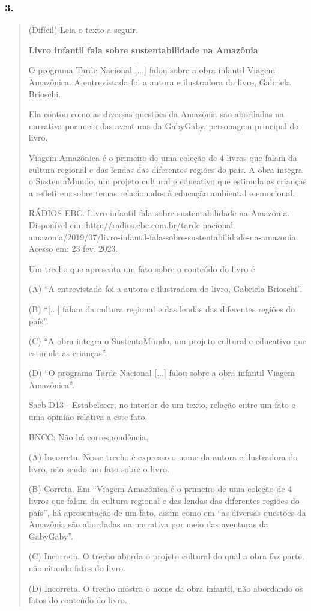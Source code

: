 \subsubsection{3.}\label{section-65}

\begin{quote}
(Difícil) Leia o texto a seguir.

\textbf{Livro infantil fala sobre sustentabilidade na Amazônia}

O programa Tarde Nacional {[}...{]} falou sobre a obra infantil Viagem
Amazônica. A entrevistada foi a autora e ilustradora do livro, Gabriela
Brioschi.

Ela contou como as diversas questões da Amazônia são abordadas na
narrativa por meio das aventuras da GabyGaby, personagem principal do
livro.~

Viagem Amazônica é o primeiro de uma coleção de 4 livros que falam da
cultura regional e das lendas das diferentes regiões do país. A obra
integra o SustentaMundo, um projeto cultural e educativo que estimula as
crianças a refletirem sobre temas relacionados à educação ambiental e
emocional.

RÁDIOS EBC. Livro infantil fala sobre sustentabilidade na Amazônia.
Disponível em:
http://radios.ebc.com.br/tarde-nacional-amazonia/2019/07/livro-infantil-fala-sobre-sustentabilidade-na-amazonia.
Acesso em: 23 fev. 2023.

Um trecho que apresenta um fato sobre o conteúdo do livro é

(A) ``A entrevistada foi a autora e ilustradora do livro, Gabriela
Brioschi''.

(B) ``{[}...{]} falam da cultura regional e das lendas das diferentes
regiões do país''.

(C) ``A obra integra o SustentaMundo, um projeto cultural e educativo
que estimula as crianças''.

(D) ``O programa Tarde Nacional {[}...{]} falou sobre a obra infantil
Viagem Amazônica''.

Saeb D13 - Estabelecer, no interior de um texto, relação entre um fato e
uma opinião relativa a este fato.

BNCC: Não há correspondência.

(A) Incorreta. Nesse trecho é expresso o nome da autora e ilustradora do
livro, não sendo um fato sobre o livro.

(B) Correta. Em ``Viagem Amazônica é o primeiro de uma coleção de 4
livros que falam da cultura regional e das lendas das diferentes regiões
do país'', há apresentação de um fato, assim como em ``as diversas
questões da Amazônia são abordadas na narrativa por meio das aventuras
da GabyGaby''.

(C) Incorreta. O trecho aborda o projeto cultural do qual a obra faz
parte, não citando fatos do livro.

(D) Incorreta. O trecho mostra o nome da obra infantil, não abordando os
fatos do conteúdo do livro.
\end{quote}

